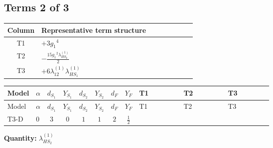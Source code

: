 \documentclass[8pt]{article}
\begin{document}
\begin{landscape}
\subsection*{Terms 2 of 3}
\begin{center}
\begin{tabular}{@{}c >{\raggedright\arraybackslash}p{0.82\linewidth}@{}}
\toprule
Column & Representative term structure \\
\midrule
T1 & \(\displaystyle +3 {g_1}^4\) \\
\midrule
T2 & \(\displaystyle -\frac{15 {g_1}^2 {\lambda_{HS_2}^{(1)}}}{2}\) \\
\midrule
T3 & \(\displaystyle +6 {\lambda_{12}^{(1)}} {\lambda_{HS_1}^{(1)}}\) \\
\midrule
\bottomrule
\end{tabular}
\end{center}
\smallskip
\tiny
\begin{longtable}{@{}llcccccc >{\raggedright\arraybackslash}p{0.21\linewidth} >{\raggedright\arraybackslash}p{0.21\linewidth} >{\raggedright\arraybackslash}p{0.21\linewidth}@{}}
\toprule
Model & $\alpha$ & $d_{S_1}$ & $Y_{S_1}$ & $d_{S_2}$ & $Y_{S_2}$ & $d_F$ & $Y_F$ & T1 & T2 & T3 \\
\midrule
\endfirsthead
\toprule
Model & $\alpha$ & $d_{S_1}$ & $Y_{S_1}$ & $d_{S_2}$ & $Y_{S_2}$ & $d_F$ & $Y_F$ & T1 & T2 & T3 \\
\midrule
\endhead
T3-D & $0$ & $3$ & $0$ & $1$ & $1$ & $2$ & $\frac{1}{2}$ & \scriptsize\adjustbox{max width=\linewidth}{$\begin{gathered} +3 {g_1}^4\end{gathered}$} & \scriptsize\adjustbox{max width=\linewidth}{$\begin{gathered} -\frac{15 {g_1}^2 {\lambda_{HS_2}^{(1)}}}{2}\end{gathered}$} & \scriptsize\adjustbox{max width=\linewidth}{$\begin{gathered} +6 {\lambda_{12}^{(1)}} {\lambda_{HS_1}^{(1)}}\end{gathered}$} \\
\midrule
\bottomrule
\end{longtable}
\clearpage
\noindent\textbf{Quantity: }$\lambda_{HS_2}^{(1)}$\par\smallskip

\end{landscape}
\end{document}
